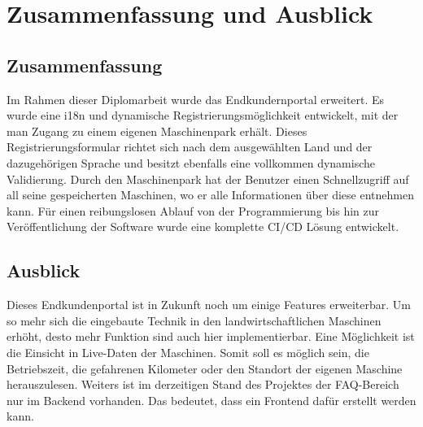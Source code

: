 \chapter{Zusammenfassung und Ausblick}
\section{Zusammenfassung}
Im Rahmen dieser Diplomarbeit wurde das Endkundernportal erweitert. Es wurde eine i18n und dynamische Registrierungsmöglichkeit entwickelt, mit der man Zugang zu einem eigenen Maschinenpark erhält. Dieses Registrierungsformular richtet sich nach dem ausgewählten Land und der dazugehörigen Sprache und besitzt ebenfalls eine vollkommen dynamische Validierung. Durch den Maschinenpark hat der Benutzer einen Schnellzugriff auf all seine gespeicherten Maschinen, wo er alle Informationen über diese entnehmen kann. Für einen reibungslosen Ablauf von der Programmierung bis hin zur Veröffentlichung der Software wurde eine komplette CI/CD Lösung entwickelt.

\section{Ausblick}
Dieses Endkundenportal ist in Zukunft noch um einige Features erweiterbar. Um so mehr sich die eingebaute Technik in den landwirtschaftlichen Maschinen erhöht, desto mehr Funktion sind auch hier implementierbar. Eine Möglichkeit ist die Einsicht in Live-Daten der Maschinen. Somit soll es möglich sein, die Betriebszeit, die gefahrenen Kilometer oder den Standort der eigenen Maschine herauszulesen. Weiters ist im derzeitigen Stand des Projektes der FAQ-Bereich nur im Backend vorhanden. Das bedeutet, dass ein Frontend dafür erstellt werden kann.